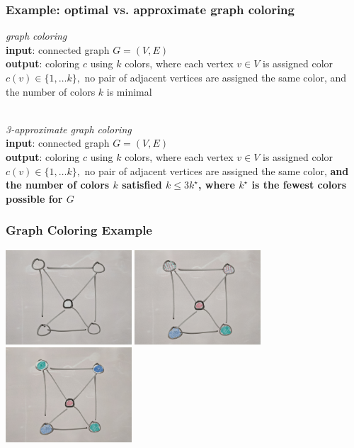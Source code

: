 \documentclass{beamer}
\newcommand{\stanza}{ \\~\ }
\begin{document}
\begin{frame} \frametitle{Example: optimal vs. approximate graph coloring}
\emph{graph coloring} \\
\textbf{input}: connected graph $G=(V,E)$ \\
\textbf{output}: coloring $c$ using $k$ colors, where each vertex $v \in V$ is assigned color
  $c(v) \in \{1, \ldots k\},$ no pair of adjacent vertices are assigned the
  same color, and the number of colors $k$ is minimal
\stanza

\emph{3-approximate graph coloring} \\
\textbf{input}: connected graph $G=(V,E)$ \\
\textbf{output}: coloring $c$ using $k$ colors, where each vertex $v \in V$ is assigned color
  $c(v) \in \{1, \ldots k\},$ no pair of adjacent vertices are assigned the
  same color, \textbf{and the number of colors $k$ satisfied $k \leq 3 k^\star$,
  where $k^\star$ is the fewest colors possible for $G$}
\end{frame}

\begin{frame} \frametitle{Graph Coloring Example}
  \begin{center}
    \includegraphics[height=100pt]{13-graph-uncolored.jpg}
    \includegraphics[height=100pt]{13-graph-colored-suboptimal.jpg}
    \includegraphics[height=100pt]{13-graph-colored-optimal.jpg}
  \end{center}
\end{frame}
\end{document}
